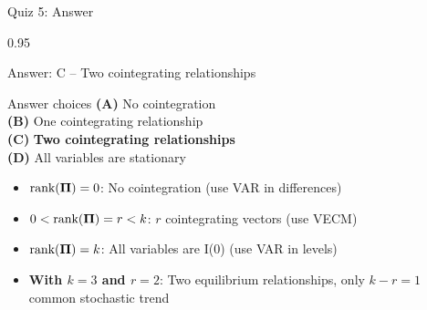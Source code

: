 \documentclass[9pt, aspectratio=169, t]{beamer}
\begin{document}
\begin{frame}{Quiz 5: Answer}
    \begin{cminipage}{0.95\textwidth}
    {\small
    \begin{exampleblock}{Answer: C -- Two cointegrating relationships}

    \begin{block}{Answer choices}
        \textcolor{MainBlue}{\textbf{(A)}} No cointegration \incorrect\\[3pt]
        \textcolor{MainBlue}{\textbf{(B)}} One cointegrating relationship \incorrect\\[3pt]
        \textcolor{MainBlue}{\textbf{(C)}} \textbf{\textcolor{Forest}{Two cointegrating relationships}} \correct\\[3pt]
        \textcolor{MainBlue}{\textbf{(D)}} All variables are stationary \incorrect
    \end{block}

        \vspace{0.2cm}

        \begin{itemize}
            \item $\text{rank}(\boldsymbol{\Pi}) = 0$: No cointegration (use VAR in differences)
            \item $0 < \text{rank}(\boldsymbol{\Pi}) = r < k$: $r$ cointegrating vectors (use VECM)
            \item $\text{rank}(\boldsymbol{\Pi}) = k$: All variables are I(0) (use VAR in levels)
            \item \textbf{With $k=3$ and $r=2$}: Two equilibrium relationships, only $k - r = 1$ common stochastic trend
        \end{itemize}
    \end{exampleblock}
    }
    \end{cminipage}
\end{frame}
\end{document}
